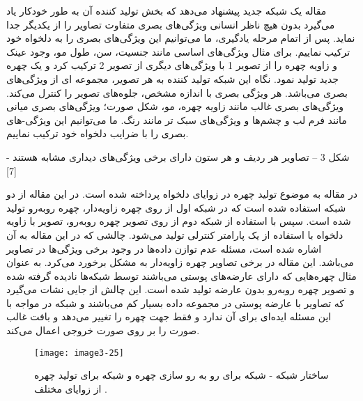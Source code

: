 \noindent
مقاله \cite{karras2019stylebased} یک شبکه  جدید پیشنهاد می‌دهد که بخش تولید کننده آن به طور خودکار یاد می‌گیرد بدون هیچ ناظر انسانی ویژگی‌های بصری متفاوت تصاویر را از یکدیگر جدا نماید. پس از اتمام مرحله یادگیری، ما می‌توانیم این ویژگی‌های بصری را به دلخواه خود ترکیب نماییم. برای مثال ویژگی‌های اساسی مانند جنسیت، سن، طول مو، وجود عینک و زاویه چهره را از تصویر 1 با ویژگی‌های دیگری از تصویر 2 ترکیب کرد و یک چهره جدید تولید نمود. نگاه این شبکه تولید کننده به هر تصویر، مجموعه ای از ویژگی‌های بصری می‌باشد. هر ویژگی بصری با اندازه مشخص، جلوه‌های تصویر را کنترل می‌کند. ویژگی‌های بصری غالب مانند زاویه چهره، مو، شکل صورت؛ ویژگی‌های بصری میانی مانند فرم لب و چشم‌ها و ویژگی‌های سبک تر مانند رنگ. ما می‌توانیم این ویژگی-های بصری را با ضرایب دلخواه خود ترکیب نماییم.
 
شکل ‏3 – تصاویر هر ردیف و هر ستون دارای برخی ویژگی‌های دیداری مشابه هستند - [7]

\noindent
در مقاله \cite{8603840} به موضوع تولید چهره در زوایای دلخواه پرداخته شده است. در این مقاله از دو شبکه  استفاده شده است که در شبکه اول از روی چهره زاویه‌دار، چهره روبه‌رو تولید شده است. سپس با استفاده از شبکه  دوم از روی تصویر چهره روبه‌رو، تصویر با زاویه دلخواه با استفاده از یک پارامتر کنترلی تولید می‌شود.
\noindent
چالشی که در این مقاله به آن اشاره شده است، مسئله عدم توازن داده‌ها در وجود برخی ویژگی‌ها در تصاویر می‌باشد. این مقاله در برخی تصاویر چهره زاویه‌دار به مشکل برخورد می‌کرد. به عنوان مثال چهره‌هایی که دارای عارضه‌های پوستی می‌باشند توسط شبکه‌ها نادیده گرفته شده و تصویر چهره روبه‌رو بدون عارضه تولید شده است. این چالش از جایی نشات می‌گیرد که تصاویر با عارضه پوستی در مجموعه داده بسیار کم می‌باشند و شبکه در مواجه با این مسئله ایده‌ای برای آن ندارد و فقط جهت چهره را تغییر می‌دهد و بافت غالب صورت را بر روی صورت خروجی اعمال می‌کند. 
\begin{figure}[h]
\centering
  \texttt{[image: image3-25]}
  \caption{ساختار شبکه  - شبکه  برای رو به رو سازی چهره و شبکه  برای تولید چهره از زوایای مختلف \cite{ref1}.}
  \label{image3-1}
\end{figure}
 
